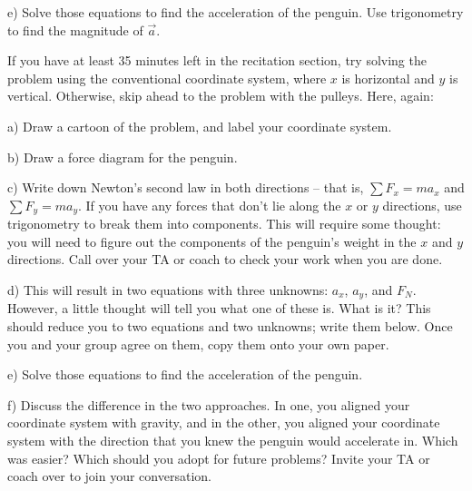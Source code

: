 \documentclass[12pt]{article}
\begin{document}
e) Solve those equations to find the acceleration of the penguin. Use trigonometry to find the magnitude of $\vec a$.

\newpage

If you have at least 35 minutes left in the recitation section, try solving the problem using the conventional coordinate system, where $x$ is horizontal and $y$ is vertical. Otherwise, skip ahead to the problem with the pulleys. Here, again:

a) Draw a cartoon of the problem, and label your coordinate system. 

\vspace{2.5in}

b) Draw a force diagram for the penguin. 


\newpage

c) Write down Newton's second law in both directions -- that is, $\sum F_x = ma_x$ and $\sum F_y = ma_y$. 
If you have any forces that don't lie along the $x$ or $y$ directions, use trigonometry to break them into components.
This will require some thought: you will need to figure out the components of the 
penguin's weight in the $x$ and $y$ directions. Call over your TA or coach to check your work when you are done.

\vspace{3in}


d) This will result in two equations with three unknowns: $a_x$, $a_y$, and $F_N$. However, a little thought will
tell you what one of these is. What is it? This should reduce you to two equations and two unknowns; write them below. Once you and your group agree on them, copy them onto your own paper.

\vspace{2in}
\newpage
e) Solve those equations to find the acceleration of the penguin.

\vspace{2in}

f) Discuss the difference in the two approaches. In one, you aligned your coordinate system with gravity, and in the other, you aligned your coordinate system with the direction that you knew the penguin would accelerate in. Which was easier? Which 
should you adopt for future problems? Invite your TA or coach over to join your conversation.
\end{document}
